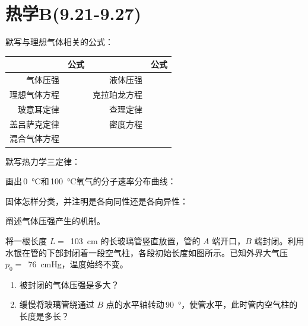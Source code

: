 \section*{热学B(9.21-9.27)}
默写与理想气体相关的公式：
\begin{table}[htbp]
  \begin{tabular}{r p{4cm}|rp{4cm}}
    \toprule
    &公式&&公式\\
    \hline
    气体压强&&液体压强&\\
    \hline
    理想气体方程&&克拉珀龙方程&\\
    \hline
    玻意耳定律&&查理定律&\\
    \hline
    盖吕萨克定律&&密度方程&\\
    \hline
    混合气体方程&\multicolumn{3}{c}{}\\
    \bottomrule
  \end{tabular}
\end{table}

默写热力学三定律：
\vspace*{4cm}

画出\,\qty{0}{\degreeCelsius}和\,\qty{100}{\degreeCelsius}氧气的分子速率分布曲线：
\vspace*{4cm}

固体怎样分类，并注明是各向同性还是各向异性：
\vspace*{4cm}

阐述气体压强产生的机制。

\newpage

将一根长度 \( L = \) \,\qty{103}{cm} 的长玻璃管竖直放置，管的 \(A\) 端开口，\(B\) 端封闭。利用水银在管的下部封闭着一段空气柱，各段初始长度如图所示。已知外界大气压 \( p_0 = \) \,\qty{76}{cmHg}，温度始终不变。

	\begin{enumerate}
    	\item[(1)] 被封闭的气体压强是多大？
    	\item[(2)] 缓慢将玻璃管绕通过 \(B\) 点的水平轴转动\,\qty{90}{\degree}，使管水平，此时管内空气柱的长度是多长？
	\end{enumerate}

\vspace*{1cm}

